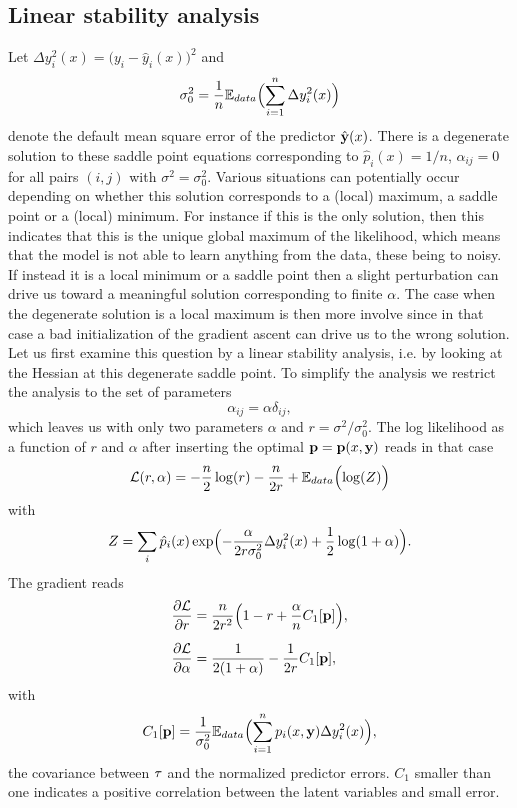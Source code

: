\documentclass[envcountsect,runningheads]{llncs}
\theoremstyle{etoile}
\begin{document}
\subsection{Linear stability analysis}
Let $\Delta y_i^2(x)= \bigl(y_i-\hat y_i(x)\bigr)^2$ and
\[
\sigma_0^2 = \frac{1}{n}{\mathbb E}_{data}\Bigl(\sum_{i=1}^n \Delta y_i^2(x)\Bigr)
\]
denote the default mean square error of the predictor ${\hat {\bf y}}(x)$.
There is a degenerate solution to these saddle point equations corresponding to $\hat p_i(x) = 1/n$, $\alpha_{ij}=0$ for all
pairs $(i,j)$ with $\sigma^2=\sigma_0^2$. Various situations can potentially occur depending on whether this solution corresponds to a (local) maximum, a saddle point or a (local) 
minimum. For instance if this is the only solution, then this indicates that this is the unique global maximum of the likelihood, which means that the model is not able to learn
anything from the data, these being to noisy. If instead it is a local minimum or a saddle point then a slight perturbation can drive us toward a meaningful solution corresponding to finite $\alpha$.
The  case when the degenerate solution is a local maximum is then more involve since in that case a bad initialization of the gradient ascent can drive us to the wrong solution.
Let us first examine this question by a linear stability analysis, i.e. by looking at the Hessian at this degenerate saddle point. To simplify the analysis
we restrict the analysis to the set of parameters
\[
\alpha_{ij} = \alpha \delta_{ij},
\]
which leaves us with only two parameters $\alpha$ and $r = \sigma^2/\sigma_0^2$. The log likelihood as a function of $r$ and $\alpha$ after inserting the optimal
${\bf p} = {\bf p}(x,{\bf y})$ reads in that case
\[
{\cal L}(r,\alpha) = -\frac{n}{2}\log(r)-\frac{n}{2r}+{\mathbb E}_{data}\Bigl(\log(Z)\Bigr)
\]
with
\[
Z = \sum_i \hat p_i(x)\exp\Bigl(-\frac{\alpha}{2r\sigma_0^2}\Delta y_i^2(x)+\frac{1}{2}\log(1+\alpha)\Bigr).
\]
The gradient reads
\begin{align*}
  \frac{\partial {\cal L}}{\partial r} &= \frac{n}{2r^2}\Bigl(1-r+\frac{\alpha}{n}C_1[{\bf p}]\Bigr),\\[0.2cm]
  \frac{\partial {\cal L}}{\partial \alpha} &= \frac{1}{2(1+\alpha)}-\frac{1}{2r}C_1[{\bf p}],  
\end{align*}
with
\[
C_1[{\bf p}] = \frac{1}{\sigma_0^2}{\mathbb E}_{data}\Bigl(\sum_{i=1}^n p_i(x,{\bf y})\Delta y_i^2(x)\Bigr),
\]
the covariance between ${\bf \tau}$ and the normalized predictor errors. $C_1$ smaller than one 
indicates a positive correlation between the latent variables and small error. 
\end{document}
